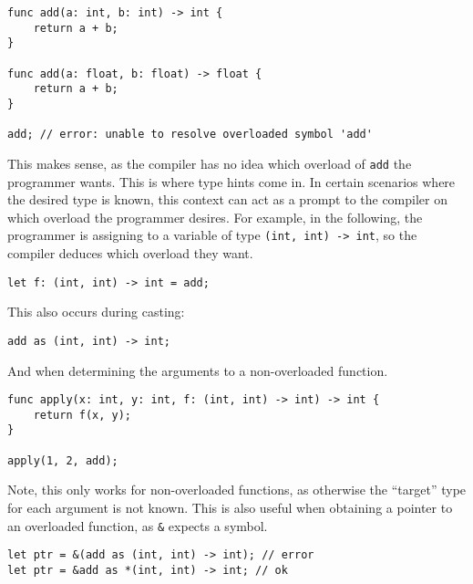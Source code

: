 \begin{lstlisting}[language=CustomLang]
func add(a: int, b: int) -> int {
    return a + b;
}

func add(a: float, b: float) -> float {
    return a + b;
}

add; // error: unable to resolve overloaded symbol 'add'
\end{lstlisting}

This makes sense, as the compiler has no idea which overload of \texttt{add} the programmer wants.
This is where type hints come in.
In certain scenarios where the desired type is known, this context can act as a prompt to the compiler on which overload the programmer desires.
For example, in the following, the programmer is assigning to a variable of type \texttt{(int, int) -> int}, so the compiler deduces which overload they want.

\begin{lstlisting}[language=CustomLang]
let f: (int, int) -> int = add;
\end{lstlisting}

This also occurs during casting:

\begin{lstlisting}[language=CustomLang]
add as (int, int) -> int;
\end{lstlisting}

And when determining the arguments to a non-overloaded function.

\begin{lstlisting}[language=CustomLang]
func apply(x: int, y: int, f: (int, int) -> int) -> int {
    return f(x, y);
}

apply(1, 2, add);
\end{lstlisting}

Note, this only works for non-overloaded functions, as otherwise the ``target'' type for each argument is not known.
This is also useful when obtaining a pointer to an overloaded function, as \texttt{\&} expects a symbol.

\begin{lstlisting}[language=CustomLang]
let ptr = &(add as (int, int) -> int); // error
let ptr = &add as *(int, int) -> int; // ok
\end{lstlisting}
